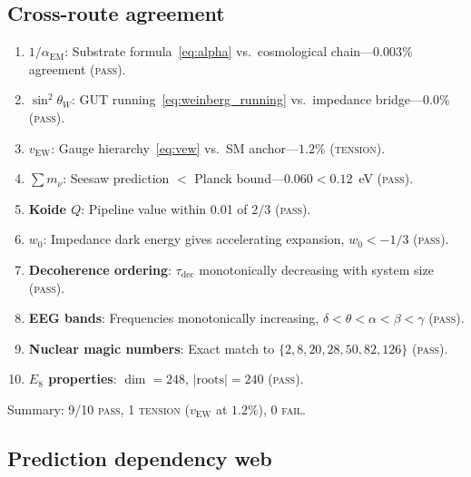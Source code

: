 \documentclass[aps,prd,twocolumn,superscriptaddress,longbibliography,nofootinbib]{revtex4-2}
\newcommand{\vEW}{v_{\mathrm{EW}}}
\newcommand{\sinW}{\sin^2\!\theta_W}
\newcommand{\alphaEM}{\alpha_{\mathrm{EM}}}
\begin{document}
\subsection{Cross-route agreement}

\begin{enumerate}
\item \textbf{$1/\alphaEM$}: Substrate formula~\eqref{eq:alpha}
  vs.\ cosmological chain---$0.003\%$ agreement (\textsc{pass}).

\item \textbf{$\sinW$}: GUT running~\eqref{eq:weinberg_running}
  vs.\ impedance bridge---$0.0\%$ (\textsc{pass}).

\item \textbf{$\vEW$}: Gauge hierarchy~\eqref{eq:vew} vs.\ SM
  anchor---$1.2\%$ (\textsc{tension}).

\item \textbf{$\sum m_\nu$}: Seesaw prediction $< $ Planck
  bound---$0.060 < 0.12$~eV (\textsc{pass}).

\item \textbf{Koide $Q$}: Pipeline value within 0.01 of $2/3$
  (\textsc{pass}).

\item \textbf{$w_0$}: Impedance dark energy gives accelerating
  expansion, $w_0 < -1/3$ (\textsc{pass}).

\item \textbf{Decoherence ordering}: $\tau_{\mathrm{dec}}$
  monotonically decreasing with system size (\textsc{pass}).

\item \textbf{EEG bands}: Frequencies monotonically increasing,
  $\delta < \theta < \alpha < \beta < \gamma$ (\textsc{pass}).

\item \textbf{Nuclear magic numbers}: Exact match to
  $\{2, 8, 20, 28, 50, 82, 126\}$ (\textsc{pass}).

\item \textbf{$E_8$ properties}: $\dim = 248$, $|\text{roots}| =
  240$ (\textsc{pass}).
\end{enumerate}

Summary: 9/10 \textsc{pass}, 1 \textsc{tension} ($\vEW$ at
$1.2\%$), 0 \textsc{fail}.

\subsection{Prediction dependency web}
\end{document}
